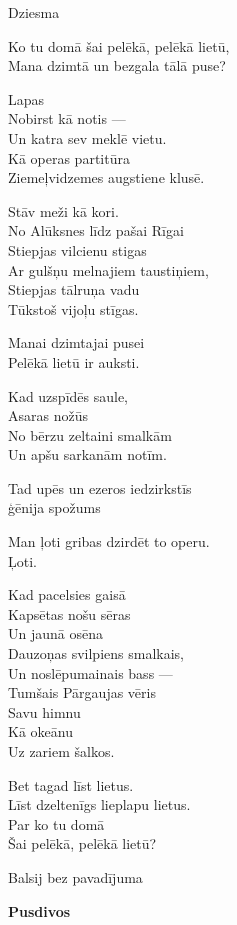 \documentclass[14pt]{extarticle}
\begin{document}
\newpage

{\large \sc  Dziesma}

Ko tu domā šai pelēkā, pelēkā lietū,\\
Mana dzimtā un bezgala tālā puse?

Lapas\\
Nobirst kā notis ---\\
Un katra sev meklē vietu.\\
Kā operas partitūra\\
Ziemeļvidzemes augstiene klusē.

Stāv meži kā kori.\\
No Alūksnes līdz pašai Rīgai\\
Stiepjas vilcienu stigas\\
Ar gulšņu melnajiem taustiņiem,\\
Stiepjas tālruņa vadu\\
Tūkstoš vijoļu stīgas.

Manai dzimtajai pusei\\
Pelēkā lietū ir auksti.

Kad uzspīdēs saule,\\
Asaras nožūs\\
No bērzu zeltaini smalkām\\
Un apšu sarkanām notīm.

Tad upēs un ezeros iedzirkstīs\\
ģēnija spožums

Man ļoti gribas dzirdēt to operu.\\
Ļoti.

Kad pacelsies gaisā\\
Kapsētas nošu sēras\\
Un jaunā osēna\\
Dauzoņas svilpiens smalkais,\\
Un noslēpumainais bass ---\\
Tumšais Pārgaujas vēris\\
Savu himnu\\
Kā okeānu\\
Uz zariem šalkos.

Bet tagad līst lietus.\\
Līst dzeltenīgs lieplapu lietus.\\
Par ko tu domā\\
Šai pelēkā, pelēkā lietū?


\newpage

{\large \sc Balsij bez pavadījuma}

{\bf Pusdivos}
\end{document}
